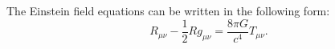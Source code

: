\documentclass{article}
\begin{document}
The Einstein field equations can be written in the following form:
\begin{equation}
  R_{\mu\nu} - \frac{1}{2} R g_{\mu\nu} = \frac{8\pi G}{c^4} T_{\mu\nu} .
\end{equation}
\end{document}
